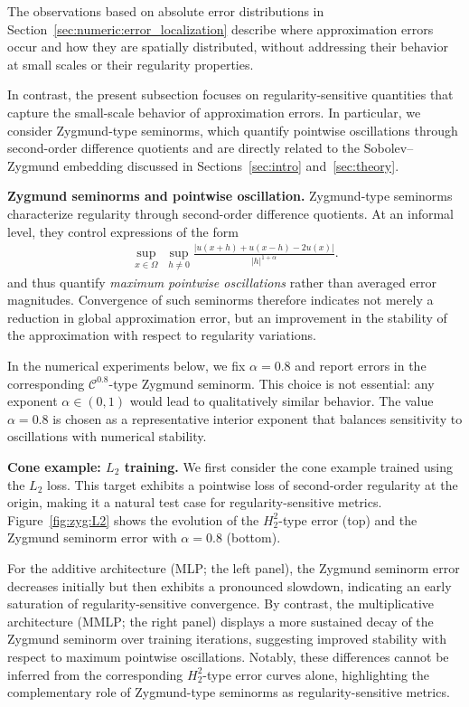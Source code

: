 \documentclass[11pt,reqno]{amsart}
\numberwithin{equation}{section}
\theoremstyle{remark}
\theoremstyle{definition}
\newcommand{\emphTitle}[1]{\medskip\noindent\textbf{#1.}\quad}
\def \L {L_2}
\def \H {H^2_2}
\def \C {\cC^{0.8}}
\newcommand\cC{\mathcal{C}}
\begin{document}
The observations based on absolute error distributions in Section~\ref{sec:numeric:error_localization} describe where approximation errors occur and how they are spatially distributed, without addressing their behavior at small scales or their regularity properties.

In contrast, the present subsection focuses on regularity-sensitive quantities that capture the small-scale behavior of approximation errors.
In particular, we consider Zygmund-type seminorms, which quantify pointwise oscillations through second-order difference quotients and are directly related to the Sobolev--Zygmund embedding discussed in Sections~\ref{sec:intro} and~\ref{sec:theory}.


\emphTitle{Zygmund seminorms and pointwise oscillation}
Zygmund-type seminorms characterize regularity through second-order difference quotients.
At an informal level, they control expressions of the form
\begin{align}
    \sup_{x \in \Omega} \;
    \sup_{h \neq 0}
    \frac{\left| u(x+h) + u(x-h) - 2u(x) \right|}{|h|^{1+\alpha}} .
\end{align}
and thus quantify \emph{maximum pointwise oscillations} rather than averaged error magnitudes.
Convergence of such seminorms therefore indicates not merely a reduction in global approximation error, but an improvement in the stability of the approximation with respect to regularity variations.

In the numerical experiments below, we fix $\alpha=0.8$ and report errors in the corresponding $\C$-type Zygmund seminorm.
This choice is not essential: any exponent $\alpha\in(0,1)$ would lead to qualitatively similar behavior.
The value $\alpha=0.8$ is chosen as a representative interior exponent that balances sensitivity to oscillations with numerical stability.


\emphTitle{Cone example: $\L$ training}
We first consider the cone example trained using the $\L$ loss. This target exhibits a pointwise loss of second-order regularity at the origin, making it a natural test case for regularity-sensitive metrics.
Figure~\ref{fig:zyg:L2} shows the evolution of the $\H$-type error (top) and the Zygmund seminorm error with $\alpha=0.8$ (bottom).

For the additive architecture (MLP; the left panel), the Zygmund seminorm error decreases initially but then exhibits a pronounced slowdown, indicating an early saturation of regularity-sensitive convergence.
By contrast, the multiplicative architecture (MMLP; the right panel) displays a more sustained decay of the Zygmund seminorm over training iterations, suggesting improved stability with respect to maximum pointwise oscillations.
Notably, these differences cannot be inferred from the corresponding \(\H\)-type error curves alone, highlighting the complementary role of Zygmund-type seminorms as regularity-sensitive metrics.
\end{document}
